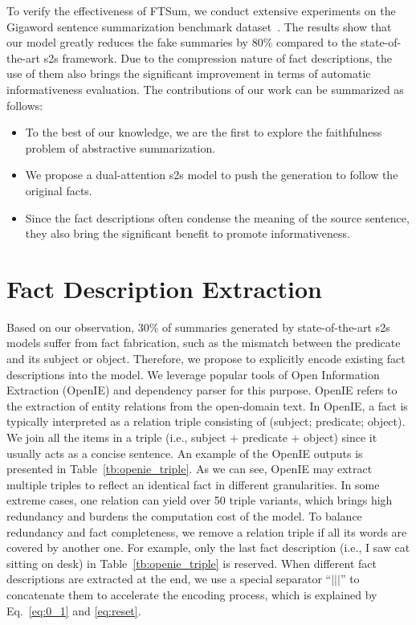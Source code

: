 \documentclass[letterpaper]{article} %
\begin{document}
	To verify the effectiveness of FTSum, we conduct extensive experiments on the Gigaword sentence summarization benchmark dataset~\cite{rush-chopra-weston:2015:EMNLP}.
	The results show that our model greatly reduces the fake summaries by 80\% compared to the state-of-the-art s2s framework.
	Due to the compression nature of fact descriptions, the use of them also brings the significant improvement in terms of automatic informativeness evaluation. 
	The contributions of our work can be summarized as follows:
	\begin{itemize}
		\item To the best of our knowledge, we are the first to explore the faithfulness problem of abstractive summarization.
		\item We propose a dual-attention s2s model to push the generation to follow the original facts.
		\item Since the fact descriptions often condense the meaning of
		the source sentence, they also bring the significant benefit to promote informativeness.
	\end{itemize}
	
	
	\section{Fact Description Extraction}
	Based on our observation, 30\% of summaries generated by state-of-the-art s2s models suffer from fact fabrication, such as the mismatch between the predicate and its subject or object.
	Therefore, we propose to explicitly encode existing fact descriptions into the model.
	We leverage popular tools of Open Information Extraction (OpenIE) and dependency parser for this purpose.
	OpenIE refers to the extraction of entity relations from the open-domain text. 
	In OpenIE, a fact is typically interpreted as a relation triple consisting of (subject; predicate; object).
	We join all the items in a triple (i.e., subject + predicate + object) since it usually acts as a concise sentence.
	An example of the OpenIE outputs is presented in Table~\ref{tb:openie_triple}.
	As we can see,  OpenIE may extract multiple triples to reflect an identical fact in different granularities.
	In some extreme cases, one relation can yield over 50 triple variants, which brings high redundancy and burdens the computation cost of the model.
	To balance redundancy and fact completeness, we remove a relation triple if all its words are covered by another one.
	For example, only the last fact description (i.e., I saw cat sitting on desk) in Table~\ref{tb:openie_triple} is reserved.
	When different fact descriptions are extracted at the end, we use a special separator ``$|||$'' to concatenate them to accelerate the encoding process, which is explained by Eq.~\ref{eq:0_1} and \ref{eq:reset}.
	
\end{document}
